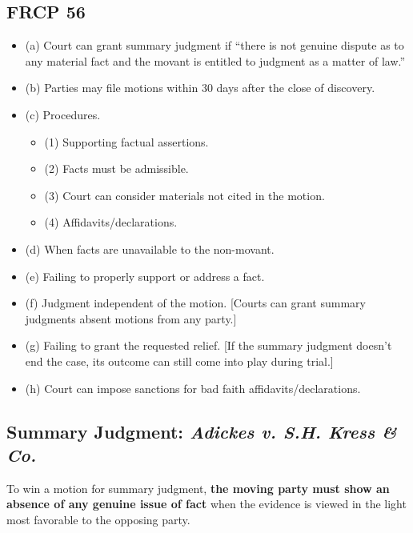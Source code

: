\subsection{FRCP 56}

\begin{itemize}
    \item (a) Court can grant summary judgment if ``there is not genuine 
    dispute as to any material fact and the movant is entitled to judgment as 
    a matter of law.''
    \item (b) Parties may file motions within 30 days after the close of 
    discovery.
    \item (c) Procedures.
    \begin{itemize}
        \item (1) Supporting factual assertions.
        \item (2) Facts must be admissible.
        \item (3) Court can consider materials not cited in the motion.
        \item (4) Affidavits/declarations.
    \end{itemize}
    \item (d) When facts are unavailable to the non-movant.
    \item (e) Failing to properly support or address a fact.
    \item (f) Judgment independent of the motion. [Courts can grant summary 
    judgments absent motions from any party.]
    \item (g) Failing to grant the requested relief. [If the summary judgment 
    doesn't end the case, its outcome can still come into play during trial.]
    \item (h) Court can impose sanctions for bad faith 
    affidavits/declarations.
\end{itemize}

\subsection{Summary Judgment: \emph{Adickes v. S.H. Kress \& Co.}}

To win a motion for summary judgment, \textbf{the moving party must show an 
absence of any genuine issue of fact} when the evidence is viewed in the light 
most favorable to the opposing party.

